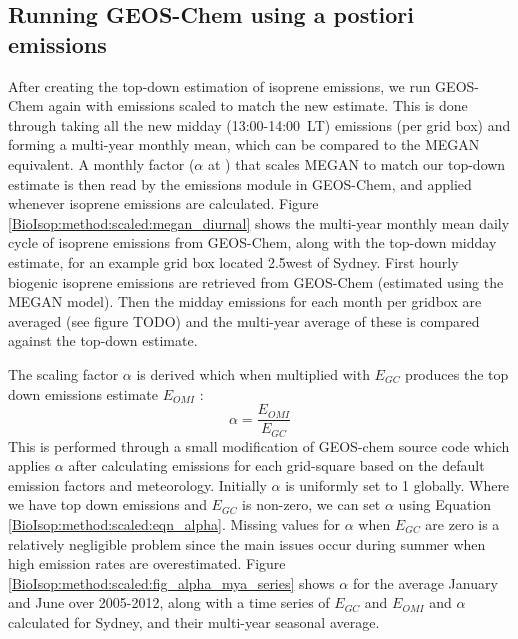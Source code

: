   \subsection{Running GEOS-Chem using a postiori emissions}
  \label{BioIsop:method:scaled}
    
    After creating the top-down estimation of isoprene emissions, we run GEOS-Chem again with emissions scaled to match the new estimate. 
    This is done through taking all the new midday (13:00-14:00~LT) emissions (per grid box) and forming a multi-year monthly mean, which can be compared to the MEGAN equivalent.
    A monthly factor ($\alpha$ at \lowhr) that scales MEGAN to match our top-down estimate is then read by the emissions module in GEOS-Chem, and applied whenever isoprene emissions are calculated.
    Figure \ref{BioIsop:method:scaled:megan_diurnal} shows the multi-year monthly mean daily cycle of isoprene emissions from GEOS-Chem, along with the top-down midday estimate, for an example grid box located 2.5\degr west of Sydney.
    First hourly biogenic isoprene emissions are retrieved from GEOS-Chem (estimated using the MEGAN model).
    Then the midday emissions for each month per gridbox are averaged (see figure TODO) and the multi-year average of these is compared against the top-down estimate.
    
    
    The scaling factor $\alpha$ is derived which when multiplied with $E_{GC}$ produces the top down emissions estimate $E_{OMI}$ : 
    \begin{equation} \label{BioIsop:method:scaled:eqn_alpha}
        \alpha = \frac{E_{OMI}}{E_{GC}}
    \end{equation}
    This is performed through a small modification of GEOS-chem source code which applies $\alpha$ after calculating emissions for each grid-square based on the default emission factors and meteorology.
    Initially $\alpha$ is uniformly set to 1 globally.
    Where we have top down emissions and $E_{GC}$ is non-zero, we can set $\alpha$ using Equation \ref{BioIsop:method:scaled:eqn_alpha}.
    Missing values for $\alpha$ when $E_{GC}$ are zero is a relatively negligible problem since the main issues occur during summer when high emission rates are overestimated.
    Figure \ref{BioIsop:method:scaled:fig_alpha_mya_series} shows $\alpha$ for the average January and June over 2005-2012, along with a time series of $E_{GC}$ and $E_{OMI}$ and $\alpha$ calculated for Sydney, and their multi-year seasonal average.
    
